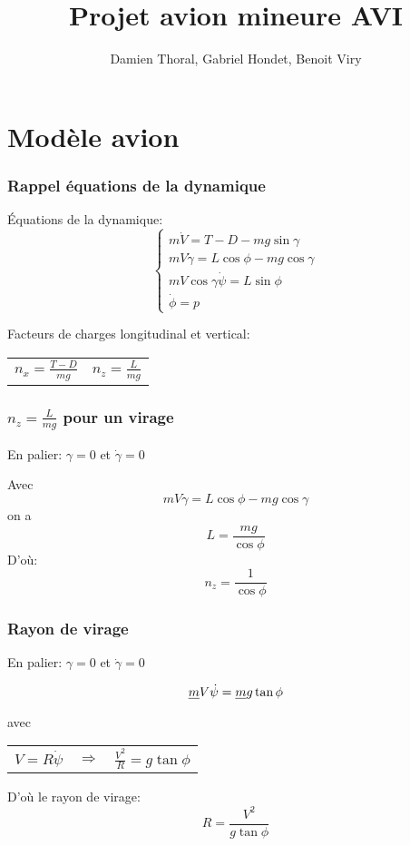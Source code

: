 \documentclass[footheight=2em]{beamer}
\title{Projet avion mineure AVI}
\author{Damien Thoral, Gabriel Hondet, Benoit Viry}
\date{}
\begin{document}
\frame{\titlepage}

\section{Modèle avion}
\begin{frame}
    \frametitle{Rappel équations de la dynamique} \pause{}
    \'Equations de la dynamique:
    \[
    \left \{
    \begin{array}{l}
        m\dot{V} = T - D - mg\sin \gamma \\
        mV\dot{\gamma} = L\cos \phi - mg \cos \gamma \\
        mV \cos \gamma \dot{\psi} = L \sin \phi \\
        \dot{\phi} = p
    \end{array}
    \right.
    \]

    Facteurs de charges longitudinal et vertical:

    \begin{center}
        \begin{tabular}{cc}
            \(n_x = \frac{T - D}{mg}\) & \(n_z = \frac{L}{mg}\)
        \end{tabular}
    \end{center}
\end{frame}

\begin{frame}
    \frametitle{\(n_z = \frac{L}{mg}\) pour un virage}\pause{}
    En palier: \(\gamma = 0\) et \(\dot{\gamma} = 0\) \pause{}

    Avec \[ mV\dot{\gamma} = L\cos \phi - mg \cos \gamma \]
    on a \[ L=\frac{mg}{\cos \phi}\] \pause{}
    D'où:\[ \boxed{n_z = \frac{1}{\cos \phi}}\]
\end{frame}

\begin{frame}
    \frametitle{Rayon de virage}\pause{}
    En palier: \(\gamma = 0\) et \(\dot{\gamma} = 0\) \pause{}

    \[ \sout{m}V\dot{\psi} = \sout{m}g\tan \phi \] \pause{}
    avec

    \begin{center}
        \begin{tabular}{ccc}
            \(V = R\dot{\psi}\) & \(\Longrightarrow \) &
            \(\frac{V^2}{R} = g \tan \phi \)
        \end{tabular}
    \end{center}\pause{}

    D'où le rayon de virage:
    \[ \boxed{R = \frac{V^2}{g\tan \phi}}\]
\end{frame}
\end{document}
